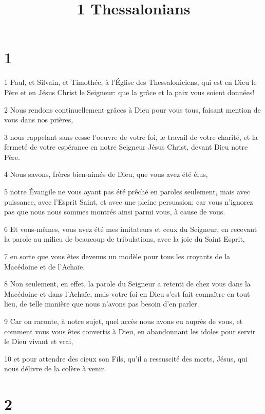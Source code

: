 

\title{1 Thessalonians}


\chapter{1}

\par 1 Paul, et Silvain, et Timothée, à l'Église des Thessaloniciens, qui est en Dieu le Père et en Jésus Christ le Seigneur: que la grâce et la paix vous soient données!
\par 2 Nous rendons continuellement grâces à Dieu pour vous tous, faisant mention de vous dans nos prières,
\par 3 nous rappelant sans cesse l'oeuvre de votre foi, le travail de votre charité, et la fermeté de votre espérance en notre Seigneur Jésus Christ, devant Dieu notre Père.
\par 4 Nous savons, frères bien-aimés de Dieu, que vous avez été élus,
\par 5 notre Évangile ne vous ayant pas été prêché en paroles seulement, mais avec puissance, avec l'Esprit Saint, et avec une pleine persuasion; car vous n'ignorez pas que nous nous sommes montrés ainsi parmi vous, à cause de vous.
\par 6 Et vous-mêmes, vous avez été mes imitateurs et ceux du Seigneur, en recevant la parole au milieu de beaucoup de tribulations, avec la joie du Saint Esprit,
\par 7 en sorte que vous êtes devenus un modèle pour tous les croyants de la Macédoine et de l'Achaïe.
\par 8 Non seulement, en effet, la parole du Seigneur a retenti de chez vous dans la Macédoine et dans l'Achaïe, mais votre foi en Dieu s'est fait connaître en tout lieu, de telle manière que nous n'avons pas besoin d'en parler.
\par 9 Car on raconte, à notre sujet, quel accès nous avons eu auprès de vous, et comment vous vous êtes convertis à Dieu, en abandonnant les idoles pour servir le Dieu vivant et vrai,
\par 10 et pour attendre des cieux son Fils, qu'il a ressuscité des morts, Jésus, qui nous délivre de la colère à venir.

\chapter{2}

